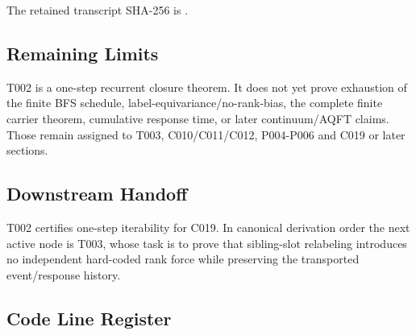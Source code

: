 The retained transcript SHA-256 is
\texttt{\protect{}}.

\subsection{Remaining Limits}\label{remaining-limits-10}

T002 is a one-step recurrent closure theorem. It does not yet prove
exhaustion of the finite BFS schedule, label-equivariance/no-rank-bias,
the complete finite carrier theorem, cumulative response time, or later
continuum/AQFT claims. Those remain assigned to T003, C010/C011/C012,
P004-P006 and C019 or later sections.

\subsection{Downstream Handoff}\label{downstream-handoff-30}

T002 certifies one-step iterability for C019. In canonical derivation
order the next active node is T003, whose task is to prove that
sibling-slot relabeling introduces no independent hard-coded rank force
while preserving the transported event/response history.

\subsection{Code Line Register}\label{code-line-register-10}

